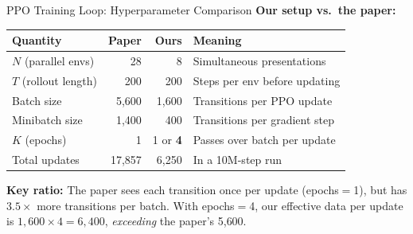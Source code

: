 \documentclass[aspectratio=169,11pt]{beamer}
\begin{document}
\begin{frame}{PPO Training Loop: Hyperparameter Comparison}
  \small
  \textbf{Our setup vs.\ the paper:}
  \begin{center}
  \begin{tabular}{lrrl}
    \toprule
    \textbf{Quantity} & \textbf{Paper} & \textbf{Ours} & \textbf{Meaning} \\
    \midrule
    $N$ (parallel envs) & 28 & 8 & Simultaneous presentations \\
    $T$ (rollout length) & 200 & 200 & Steps per env before updating \\
    Batch size & 5{,}600 & 1{,}600 & Transitions per PPO update \\
    Minibatch size & 1{,}400 & 400 & Transitions per gradient step \\
    $K$ (epochs) & 1 & 1 or \textbf{4} & Passes over batch per update \\
    Total updates & 17{,}857 & 6{,}250 & In a 10M-step run \\
    \bottomrule
  \end{tabular}
  \end{center}

  \medskip
  \textbf{Key ratio:} The paper sees each transition once per update (epochs$=$1),
  but has $3.5\times$ more transitions per batch.
  With epochs$=$4, our effective data per update is $1{,}600 \times 4 = 6{,}400$,
  \emph{exceeding} the paper's 5{,}600.
\end{frame}
\end{document}
